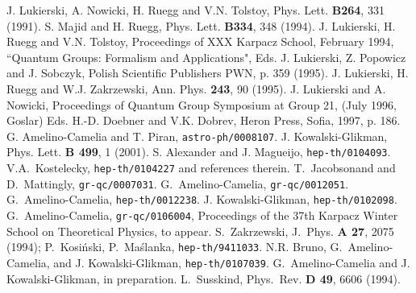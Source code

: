 \documentclass[a4paper,a4paper]{article}
\begin{document}
\begin{thebibliography}{99}
 J. Lukierski, A. Nowicki, H. Ruegg and V.N. Tolstoy,
Phys. Lett.  {\bf B264}, 331 (1991).
 S. Majid and H. Ruegg, Phys. Lett. {\bf B334},
348 (1994).
 J. Lukierski, H. Ruegg and V.N. Tolstoy,
Proceedings of XXX Karpacz School, February 1994, ``Quantum
Groups: Formalism and Applications", Eds. J. Lukierski,
 Z. Popowicz and J. Sobczyk, Polish Scientific Publishers PWN,
p. 359 (1995).
 J. Lukierski, H. Ruegg and W.J. Zakrzewski, Ann.
Phys. {\bf 243}, 90 (1995).
 J. Lukierski and A. Nowicki, Proceedings of
Quantum Group Symposium at Group 21, (July 1996, Goslar) Eds.
H.-D. Doebner and V.K. Dobrev, Heron Press, Sofia, 1997, p. 186.
 G. Amelino-Camelia and T. Piran, {\tt astro-ph/0008107}.
 J. Kowalski-Glikman, Phys. Lett. {\bf B 499}, 1 (2001).
 S. Alexander and J. Magueijo, {\tt hep-th/0104093}.
 V.A.~Kostelecky, {\tt hep-th/0104227} and references therein.
 T.~Jacobsonand and D.~Mattingly, {\tt gr-qc/0007031}.
 G.~Amelino-Camelia, {\tt gr-qc/0012051}.
 G.~Amelino-Camelia, {\tt hep-th/0012238}.
 J. Kowalski-Glikman, {\tt hep-th/0102098}.
 G.~Amelino-Camelia, {\tt gr-qc/0106004}, Proceedings of the 37th Karpacz Winter School on Theoretical Physics, to appear.
 S.~Zakrzewski, J.~Phys.  {\bf A 27}, 2075 (1994); P.~Kosi\'{n}ski, P.~Ma\'{s}lanka, {\tt hep-th/9411033}.
 N.R. Bruno, G.~Amelino-Camelia, and J. Kowalski-Glikman, {\tt hep-th/0107039}.
  G.~Amelino-Camelia and J. Kowalski-Glikman, in preparation.
 L.~Susskind, Phys.~Rev. {\bf D 49}, 6606 (1994).
\end{thebibliography}
\end{document}
